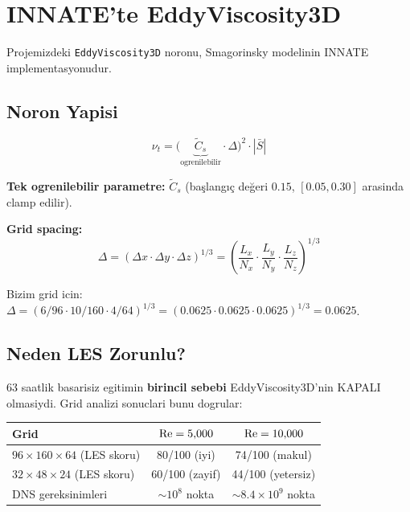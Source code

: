 \section{INNATE'te EddyViscosity3D}
\label{sec:eddy_viscosity_innate}

Projemizdeki \texttt{EddyViscosity3D} noronu, Smagorinsky modelinin INNATE implementasyonudur.

\subsection{Noron Yapisi}

\begin{equation}
\nu_t = \big(\underbrace{\tilde{C}_s}_{\text{ogrenilebilir}}\cdot\Delta\big)^2 \cdot |\bar{S}|
\end{equation}

\textbf{Tek ogrenilebilir parametre:} $\tilde{C}_s$ (başlangıç değeri $0.15$, $[0.05, 0.30]$ arasinda clamp edilir).

\textbf{Grid spacing:}
\begin{equation}
\Delta = (\Delta x \cdot \Delta y \cdot \Delta z)^{1/3} = \left(\frac{L_x}{N_x}\cdot\frac{L_y}{N_y}\cdot\frac{L_z}{N_z}\right)^{1/3}
\end{equation}

Bizim grid icin: $\Delta = (6/96 \cdot 10/160 \cdot 4/64)^{1/3} = (0.0625 \cdot 0.0625 \cdot 0.0625)^{1/3} = 0.0625$.

\subsection{Neden LES Zorunlu?}

63 saatlik basarisiz egitimin \textbf{birincil sebebi} EddyViscosity3D'nin KAPALI olmasiydi. Grid analizi sonuclari bunu dogrular:

\begin{center}
\begin{tabular}{lcc}
\toprule
Grid & $\mathrm{Re} = 5{,}000$ & $\mathrm{Re} = 10{,}000$ \\
\midrule
$96\times160\times64$ (LES skoru) & 80/100 (iyi) & 74/100 (makul) \\
$32\times48\times24$ (LES skoru) & 60/100 (zayif) & 44/100 (yetersiz) \\
DNS gereksinimleri & $\sim10^8$ nokta & $\sim8.4\times10^9$ nokta \\
\bottomrule
\end{tabular}
\end{center}

